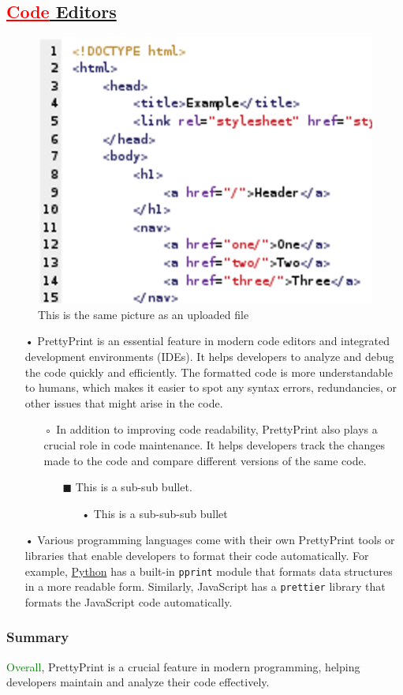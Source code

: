 \documentclass[12pt, a4paper]{article}
\makeatletter
\def\maxwidth#1{\ifdim\Gin@nat@width>#1 #1\else\Gin@nat@width\fi}
\makeatother
\begin{document}
\subsection{\textcolor{red}{\underline{Code}}\underline{ Editors}}
\begin{figure}[h]
\includegraphics[width=\maxwidth{\linewidth}]{PrettyPrint.png}
\centering
\caption{This is the same picture as an uploaded file}
\end{figure}
\begin{itemize}
\item[•] PrettyPrint is an essential feature in modern code editors and integrated development environments (IDEs). 
 It helps developers to analyze and debug the code quickly and efficiently. 
 The formatted code is more understandable to humans, which makes it easier to spot any syntax errors, redundancies, or other issues that might arise in the code.
\begin{itemize}
\item[◦] In addition to improving code readability, PrettyPrint also plays a crucial role in code maintenance. 
 It helps developers track the changes made to the code and compare different versions of the same code.
\begin{itemize}
\item[$\blacksquare$] This is a sub-sub bullet.
\begin{itemize}
\item[•] This is a sub-sub-sub bullet
\end{itemize}
\end{itemize}
\end{itemize}
\item[•] Various programming languages come with their own PrettyPrint tools or libraries that enable developers to format their code automatically. 
 For example, \href{http://python.org/}{Python} has a built-in \texttt{pprint} module that formats data structures in a more readable form. 
 Similarly, JavaScript has a \texttt{prettier} library that formats the JavaScript code automatically.
\end{itemize}
\subsubsection{Summary}
\textcolor{green}{Overall}, PrettyPrint is a crucial feature in modern programming, helping developers maintain and analyze their code effectively.
\end{document}
